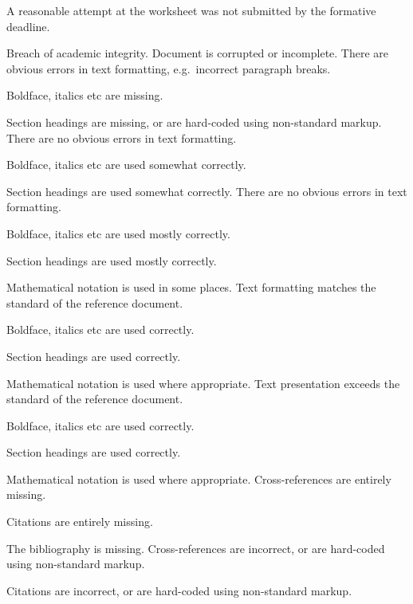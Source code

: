 \documentclass{../../../fal_assignment}
\begin{document}
\begin{markingrubric}
        \grade\fail	A reasonable attempt at the worksheet was not submitted by the formative deadline.
        \par Breach of academic integrity.
        \grade\fail Document is corrupted or incomplete.
        \grade There are obvious errors in text formatting, e.g.\ incorrect paragraph breaks.
			\par Boldface, italics etc are missing.
			\par Section headings are missing, or are hard-coded using non-standard markup.
		\grade There are no obvious errors in text formatting.
			\par Boldface, italics etc are used somewhat correctly.
			\par Section headings are used somewhat correctly.
		\grade There are no obvious errors in text formatting.
			\par Boldface, italics etc are used mostly correctly.
			\par Section headings are used mostly correctly.
			\par Mathematical notation is used in some places.
		\grade Text formatting matches the standard of the reference document.
			\par Boldface, italics etc are used correctly.
			\par Section headings are used correctly.
			\par Mathematical notation is used where appropriate.
		\grade Text presentation exceeds the standard of the reference document.
			\par Boldface, italics etc are used correctly.
			\par Section headings are used correctly.
			\par Mathematical notation is used where appropriate.
		\grade\fail Cross-references are entirely missing.
			\par Citations are entirely missing.
			\par The bibliography is missing.
		\grade Cross-references are incorrect, or are hard-coded using non-standard markup.
			\par Citations are incorrect, or are hard-coded using non-standard markup.

\end{markingrubric}
\end{document}
